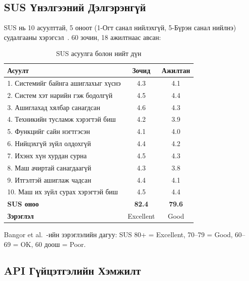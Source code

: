 \documentclass[12pt,a4paper]{article}
\begin{document}
\subsection{SUS Үнэлгээний Дэлгэрэнгүй}

SUS нь 10 асуулттай, 5 оноот (1-Огт санал нийлэхгүй, 5-Бүрэн
санал нийлнэ) судалгааны хэрэгсэл~\cite{brooke1996}. 60 зочин,
18 ажилтнаас авсан:

\begin{table}[H]
\caption{SUS асуулга болон нийт дүн}
\label{tab:sus_detail}
\centering
\begin{tabularx}{\textwidth}{@{}p{6.5cm}cc@{}}
\toprule
\textbf{Асуулт} & \textbf{Зочид} & \textbf{Ажилтан} \\
\midrule
1. Системийг байнга ашиглахыг хүснэ & 4.3 & 4.1 \\
2. Систем хэт нарийн гэж бодолгүй  & 4.5 & 4.4 \\
3. Ашиглахад хялбар санагдсан       & 4.6 & 4.3 \\
4. Техникийн тусламж хэрэгтэй биш   & 4.2 & 3.9 \\
5. Функцийг сайн нэгтгэсэн          & 4.1 & 4.0 \\
6. Нийцэхгүй зүйл олдохгүй         & 4.4 & 4.2 \\
7. Ихэнх хүн хурдан сурна           & 4.5 & 4.3 \\
8. Маш ачиртай санагдаагүй          & 4.3 & 3.8 \\
9. Итгэлтэй ашиглаж чадсан         & 4.4 & 4.1 \\
10. Маш их зүйл сурах хэрэгтэй биш & 4.5 & 4.4 \\
\midrule
\textbf{SUS оноо}                   & \textbf{82.4} & \textbf{79.6} \\
\textbf{Зэрэглэл}                   & Excellent & Good \\
\bottomrule
\end{tabularx}
\end{table}

Bangor et al.~\cite{bangor2009}-ийн зэрэглэлийн дагуу:
SUS 80+ = Excellent, 70--79 = Good, 60--69 = OK, 60 доош = Poor.

\subsection{API Гүйцэтгэлийн Хэмжилт}
\end{document}
